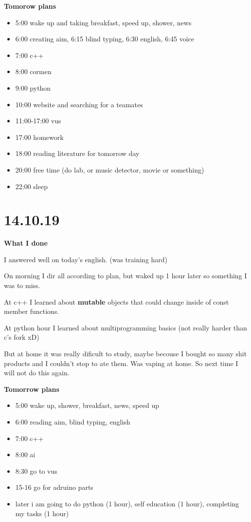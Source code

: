 \documentclass[12pt,a4paper,titlepage]{article}
\begin{document}
\begin{center}
  \large \textbf{Tomorow plans}
\end{center}

\begin{itemize}
  \item 5:00 wake up and taking breakfast, speed up, shower, news
  \item 6:00 creating aim, 6:15 blind typing, 6:30 english, 6:45 voice
  \item 7:00 c++
  \item 8:00 cormen
  \item 9:00 python
  \item 10:00 website and searching for a teamates
  \item 11:00-17:00 vus
  \item 17:00 homework
  \item 18:00 reading literature for tomorrow day
  \item 20:00 free time (do lab, or music detector, movie or something)
  \item 22:00 sleep
\end{itemize}

\newpage
\section{14.10.19}

\begin{center}
  \large \textbf{What I done}
\end{center}

I answered well on today's english. (was training hard) \par
On morning I dir all according to plan, but waked up 1 hour later so
something I was to miss. \par
At c++ I learned about \textbf{mutable} objects that could change inside
of const member functions. \par
At python hour I learned about multiprogramming basics (not really
harder than c's fork xD) \par
But at home it was really dificult to study, maybe becouse I bought so
many shit products and I couldn't stop to ate them. Was vaping at home.
So next time I will not do this again.

\begin{center}
  \large \textbf{Tomorrow plans}
\end{center}

\begin{itemize}
  \item 5:00 wake up, shower, breakfast, news, speed up
  \item 6:00 reading aim, blind typing, english
  \item 7:00 c++
  \item 8:00 ai
  \item 8:30 go to vus
  \item 15-16 go for adruino parts
  \item later i am going to do python (1 hour), self education (1 hour),
    comple\-ting my tasks (1 hour)
\end{itemize}
\end{document}
